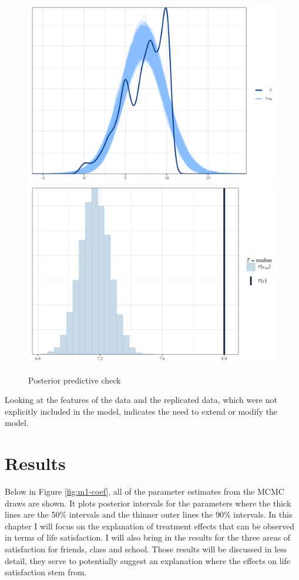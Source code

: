 \documentclass[a4, 12pt]{article}
\begin{document}
\begin{figure}
\includegraphics[width=0.5\linewidth]{../figures/post_dens_overlay} \includegraphics[width=0.5\linewidth]{../figures/post_skew} \caption{Posterior predictive check}\label{fig:post-dens-overlay}
\end{figure}

Looking at the features of the data and the replicated data, which were not explicitly included in the model, indicates the need to extend or modify the model.

\clearpage

\hypertarget{results}{%
\section{Results}\label{results}}

\label{sec:results}
Below in Figure \ref{fig:m1-coef}, all of the parameter estimates from the MCMC draws are shown. It plots posterior intervals for the parameters where the thick lines are the 50\% intervals and the thinner outer lines the 90\% intervals. In this chapter I will focus on the explanation of treatment effects that can be observed in terms of life satisfaction. I will also bring in the results for the three areas of satisfaction for friends, class and school. Those results will be discussed in less detail, they serve to potentially suggest an explanation where the effects on life satisfaction stem from.
\end{document}
